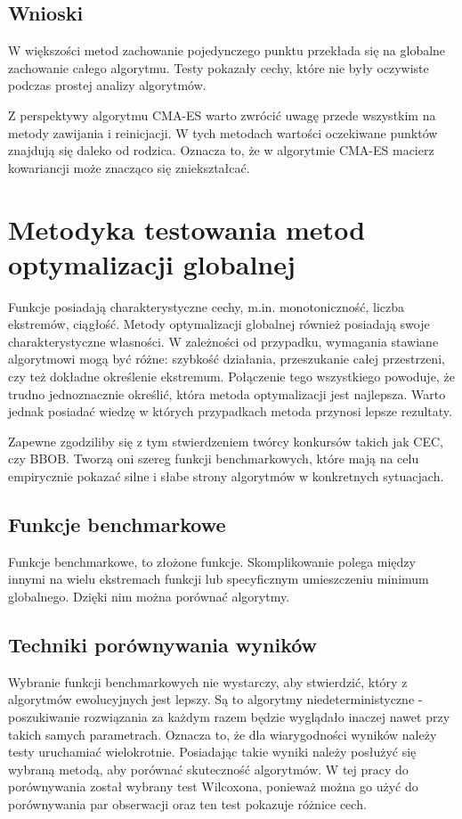 \documentclass{mini}
\begin{document}
\subsection{Wnioski}
W większości metod zachowanie pojedynczego punktu przekłada się na globalne zachowanie całego algorytmu. Testy pokazały cechy, które nie były oczywiste podczas prostej analizy algorytmów.

Z perspektywy algorytmu CMA-ES warto zwrócić uwagę przede wszystkim na metody zawijania i reinicjacji. W tych metodach wartości oczekiwane punktów znajdują się daleko od rodzica. Oznacza to, że w algorytmie CMA-ES macierz kowariancji może znacząco się zniekształcać.

\pagebreak

\section{Metodyka testowania metod optymalizacji globalnej}
Funkcje posiadają charakterystyczne cechy, m.in. monotoniczność, liczba ekstremów, ciągłość. Metody optymalizacji globalnej również posiadają swoje charakterystyczne własności. W zależności od przypadku, wymagania stawiane algorytmowi mogą być różne: szybkość działania, przeszukanie całej przestrzeni, czy też dokładne określenie ekstremum. Połączenie tego wszystkiego powoduje, że trudno jednoznacznie określić, która metoda optymalizacji jest najlepsza. Warto jednak posiadać wiedzę w których przypadkach metoda przynosi lepsze rezultaty.

Zapewne zgodziliby się z tym stwierdzeniem twórcy konkursów takich jak CEC, czy BBOB. Tworzą oni szereg funkcji benchmarkowych, które mają na celu empirycznie pokazać silne i słabe strony algorytmów w konkretnych sytuacjach.

\subsection{Funkcje benchmarkowe}
Funkcje benchmarkowe, to złożone funkcje. Skomplikowanie polega między innymi na wielu ekstremach funkcji lub specyficznym umieszczeniu minimum globalnego. Dzięki nim można porównać algorytmy.

\subsection{Techniki porównywania wyników}
Wybranie funkcji benchmarkowych nie wystarczy, aby stwierdzić, który z algorytmów ewolucyjnych jest lepszy. Są to algorytmy niedeterministyczne - poszukiwanie rozwiązania za każdym razem będzie wyglądało inaczej nawet przy takich samych parametrach. Oznacza to, że dla wiarygodności wyników należy testy uruchamiać wielokrotnie. Posiadając takie wyniki należy posłużyć się wybraną metodą, aby porównać skuteczność algorytmów. W tej pracy do porównywania został wybrany test Wilcoxona, ponieważ można go użyć do porównywania par obserwacji oraz ten test pokazuje różnice cech.
\end{document}
